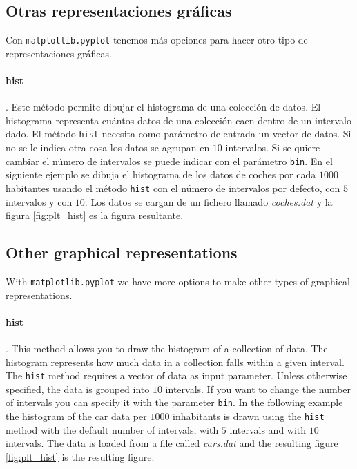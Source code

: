 \begin{paracol}{2}
    \subsection{Otras representaciones gráficas}
    Con \texttt{matplotlib.pyplot} tenemos más opciones para hacer otro tipo de representaciones gráficas.

    \paragraph{hist}. Este método permite dibujar el histograma de una colección de datos. El histograma representa cuántos datos de una colección caen dentro de un intervalo dado. El método \texttt{hist} necesita como parámetro de entrada un vector de datos. Si no se le indica otra cosa los datos se agrupan en $10$ intervalos. Si se quiere cambiar el número de intervalos se puede indicar con el parámetro \texttt{bin}. En el siguiente ejemplo se dibuja el histograma de los datos de coches por cada $1000$ habitantes usando el método \texttt{hist} con el número de intervalos por defecto, con $5$ intervalos y con $10$. Los datos se cargan de un fichero llamado \textit{coches.dat} y la figura \ref{fig:plt_hist} es la figura resultante.

    \switchcolumn
    \subsection{Other graphical representations}
    With \texttt{matplotlib.pyplot} we have more options to make other types of graphical representations.

    \paragraph{hist}. This method allows you to draw the histogram of a collection of data. The histogram represents how much data in a collection falls within a given interval. The \texttt{hist} method requires a vector of data as input parameter. Unless otherwise specified, the data is grouped into $10$ intervals. If you want to change the number of intervals you can specify it with the parameter \texttt{bin}. In the following example the histogram of the car data per $1000$ inhabitants is drawn using the \texttt{hist} method with the default number of intervals, with $5$ intervals and with $10$ intervals. The data is loaded from a file called \textit{cars.dat} and the resulting figure \ref{fig:plt_hist} is the resulting figure.
\end{paracol}

